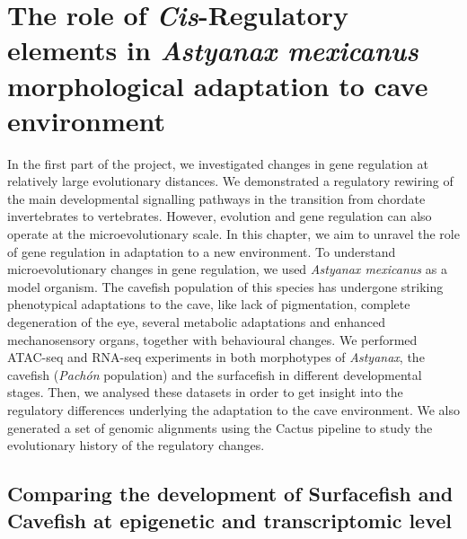 \chapter{The role of \textit{Cis}-Regulatory elements in \textit{Astyanax mexicanus} morphological adaptation to cave environment}
\label{sec:cap_astyanax}


In the first part of the project, we investigated changes in gene regulation at relatively large evolutionary distances. We demonstrated a regulatory rewiring of the main developmental signalling pathways in the transition from chordate invertebrates to vertebrates. However, evolution and gene regulation can also operate at the microevolutionary scale. In this chapter, we aim to unravel the role of gene regulation in adaptation to a new environment. To understand microevolutionary changes in gene regulation, we used \textit{Astyanax mexicanus} as a model organism. The cavefish population of this species has undergone striking phenotypical adaptations to the cave, like lack of pigmentation, complete degeneration of the eye, several metabolic adaptations and enhanced mechanosensory organs, together with behavioural changes. We performed ATAC-seq and RNA-seq experiments in both morphotypes of \textit{Astyanax}, the cavefish (\textit{Pachón} population) and the surfacefish in different developmental stages. Then, we analysed these datasets in order to get insight into the regulatory differences underlying the adaptation to the cave environment. We also generated a set of genomic alignments using the Cactus pipeline \parencite{armstrong_progressive_2020} to study the evolutionary history of the regulatory changes.


\section{Comparing the development of Surfacefish and Cavefish at epigenetic and transcriptomic level}


